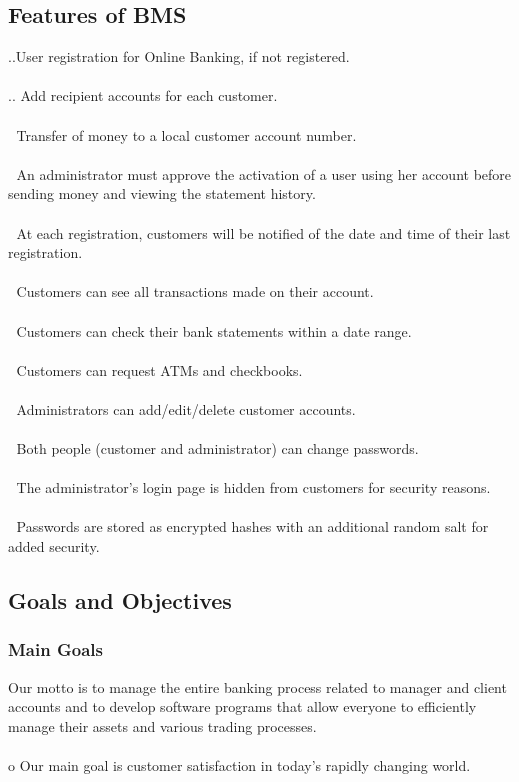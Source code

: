 \documentclass{article}
\begin{document}
\subsection{Features of BMS}
..User registration for Online Banking, if not registered.\\\\ .. Add recipient accounts for each customer.\\\\  Transfer of money to a local customer account number. \\\\ An administrator must approve the activation of a user using her account before sending money and viewing the statement history.\\\\  At each registration, customers will be notified of the date and time of their last registration. \\\\ Customers can see all transactions made on their account.\\\\  Customers can check their bank statements within a date range.\\\\  Customers can request ATMs and checkbooks.\\\\  Administrators can add/edit/delete customer accounts. \\\\ Both people (customer and administrator) can change passwords.\\\\  The administrator's login page is hidden from customers for security reasons.\\\\  Passwords are stored as encrypted hashes with an additional random salt for added security.
\newpage
\subsection{Goals and Objectives}
\subsubsection{Main Goals}
Our motto is to manage the entire banking process related to manager and client accounts and to develop software programs that allow everyone to efficiently manage their assets and various trading processes.\\\\ o Our main goal is customer satisfaction in today's rapidly changing world.
\end{document}
